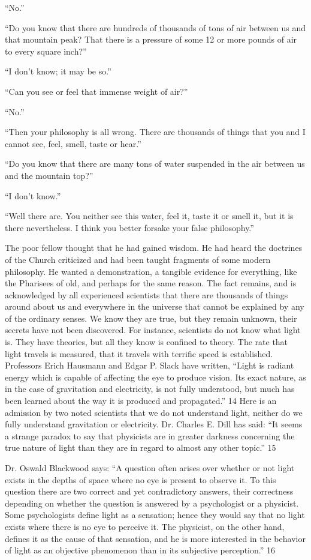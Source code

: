 ``No.''

``Do you know that there are hundreds of thousands of tons of air between us and that
mountain peak? That there is a pressure of some 12 or more pounds of air to every square
inch?''

``I don't know; it may be so.''

``Can you see or feel that immense weight of air?''

``No.''

``Then your philosophy is all wrong. There are thousands of things that you and I cannot see,
feel, smell, taste or hear.''

``Do you know that there are many tons of water suspended in the air between us and the
mountain top?''

``I don't know.''

``Well there are. You neither see this water, feel it, taste it or smell it, but it is there
nevertheless. I think you better forsake your false philosophy.''

The poor fellow thought that he had gained wisdom. He had heard the doctrines of the
Church criticized and had been taught fragments of some modern philosophy. He wanted a
demonstration, a tangible evidence for everything, like the Pharisees of old, and perhaps for
the same reason. The fact remains, and is acknowledged by all experienced scientists that
there are thousands of things around about us and everywhere in the universe that cannot be
explained by any of the ordinary senses. We know they are true, but they remain unknown,
their secrets have not been discovered. For instance, scientists do not know what light is.
They have theories, but all they know is confined to theory. The rate that light travels is
measured, that it travels with terrific speed is established. Professors Erich Hausmann and
Edgar P. Slack have written, ``Light is radiant energy which is capable of affecting the eye to
produce vision. Its exact nature, as in the case of gravitation and electricity, is not fully
understood, but much has been learned about the way it is produced and propagated.'' 14
Here is an admission by two noted scientists that we do not understand light, neither do we
fully understand gravitation or electricity. Dr. Charles E. Dill has said: ``It seems a strange
paradox to say that physicists are in greater darkness concerning the true nature of light than
they are in regard to almost any other topic.'' 15

Dr. Oswald Blackwood says: ``A question often arises over whether or not light exists in the
depths of space where no eye is present to observe it. To this question there are two correct
and yet contradictory answers, their correctness depending on whether the question is
answered by a psychologist or a physicist. Some psychologists define light as a sensation;
hence they would say that no light exists where there is no eye to perceive it. The physicist,
on the other hand, defines it as the cause of that sensation, and he is more interested in the
behavior of light as an objective phenomenon than in its subjective perception.'' 16

